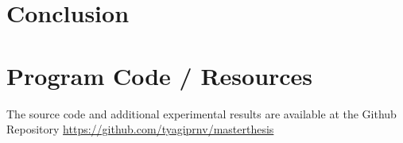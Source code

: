 \documentclass[a4paper,oneside,bibliography=totoc]{scrbook}
\begin{document}
\chapter{Conclusion}
\label{ch:conlcusion}






\appendix
\chapter{Program Code / Resources}
\label{app:gtihub}

The source code and additional experimental results are available at
the Github Repository \href{https://github.com/tyagiprnv/masterthesis}{https://github.com/tyagiprnv/masterthesis}

\scriptsize  %
\setlength{\tabcolsep}{2pt}  %
\end{document}
